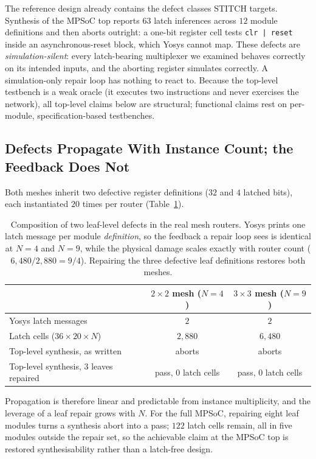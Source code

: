 \documentclass[11pt]{article}
\begin{document}
The reference design already contains the defect classes STITCH targets.
Synthesis of the MPSoC top reports $63$ latch inferences across $12$ module
definitions and then aborts outright: a one-bit register cell tests
\texttt{clr | reset} inside an asynchronous-reset block, which Yosys cannot
map. These defects are \emph{simulation-silent}: every latch-bearing
multiplexer we examined behaves correctly on its intended inputs, and the
aborting register simulates correctly. A simulation-only repair loop has
nothing to react to. Because the top-level testbench is a weak oracle (it
executes two instructions and never exercises the network), all top-level
claims below are structural; functional claims rest on per-module,
specification-based testbenches.

\subsection{Defects Propagate With Instance Count; the Feedback Does Not}
\label{sec:mpsoc-propagation}

Both meshes inherit two defective register definitions ($32$ and $4$ latched
bits), each instantiated $20$ times per router (Table~\ref{tab:mpsoc-prop}).

\begin{table}[htbp]
\centering
\caption{Composition of two leaf-level defects in the real mesh routers.
Yosys prints one latch message per module \emph{definition}, so the feedback a
repair loop sees is identical at $N{=}4$ and $N{=}9$, while the physical damage
scales exactly with router count ($6{,}480/2{,}880 = 9/4$). Repairing the three
defective leaf definitions restores both meshes.}
\label{tab:mpsoc-prop}
\small
\begin{tabularx}{\linewidth}{@{} X c c @{}}
\toprule
 & \textbf{$2{\times}2$ mesh ($N{=}4$)} & \textbf{$3{\times}3$ mesh ($N{=}9$)} \\
\midrule
Yosys latch messages               & $2$ & $2$ \\
Latch cells ($36 \times 20 \times N$) & $2{,}880$ & $6{,}480$ \\
Top-level synthesis, as written    & aborts & aborts \\
Top-level synthesis, $3$ leaves repaired & pass, $0$ latch cells & pass, $0$ latch cells \\
\bottomrule
\end{tabularx}
\end{table}

Propagation is therefore linear and predictable from instance multiplicity,
and the leverage of a leaf repair grows with $N$. For the full MPSoC,
repairing eight leaf modules turns a synthesis abort into a pass; $122$ latch
cells remain, all in five modules outside the repair set, so the achievable
claim at the MPSoC top is restored synthesisability rather than a latch-free
design.
\end{document}
